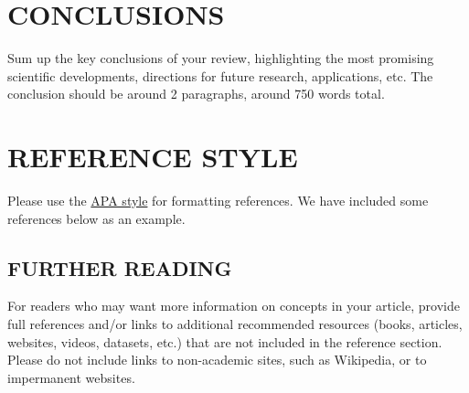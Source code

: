 \documentclass[12pt]{article}
\begin{document}
\section*{\sffamily \Large CONCLUSIONS}

Sum up the key conclusions of your review, highlighting the most promising scientific developments, directions for future research, applications, etc. The conclusion should be around 2 paragraphs, around 750 words total.

\section*{\sffamily \Large REFERENCE STYLE}
  Please use the \href{http://www.apastyle.org/learn/quick-guide-on-references.aspx}{APA style} for formatting references.  We have included some references below as an example.


\nocite{coulson1960present}
\nocite{hoffmann2008predicting}
\nocite{koros1987separation}
\nocite{malrieu1998quantum}
\nocite{perdew2009some}
\nocite{shaik2007my}


\subsection*{\sffamily \Large FURTHER READING}
For readers who may want more information on concepts in your article, provide full references and/or links to additional recommended resources (books, articles, websites, videos, datasets, etc.) that are not included in the reference section. Please do not include links to non-academic sites, such as Wikipedia, or to impermanent websites.
\end{document}
